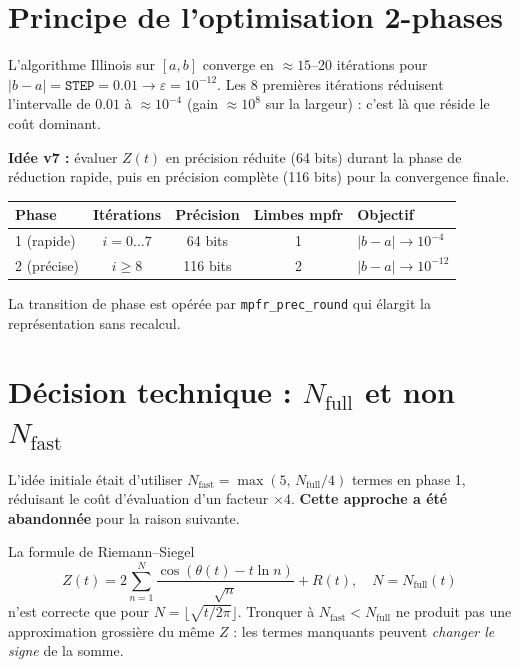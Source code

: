\documentclass[11pt,a4paper]{article}
\begin{document}
\section{Principe de l'optimisation 2-phases}

L'algorithme Illinois sur $[a, b]$ converge en $\approx 15$--20 itérations pour
$|b - a| = \texttt{STEP} = 0.01 \to \varepsilon = 10^{-12}$.
Les 8 premières itérations réduisent l'intervalle de $0.01$ à $\approx 10^{-4}$
(gain $\approx 10^{8}$ sur la largeur) : c'est là que réside le coût dominant.

\textbf{Idée v7 :} évaluer $Z(t)$ en précision réduite (64 bits) durant la phase de
réduction rapide, puis en précision complète (116 bits) pour la convergence finale.

\begin{center}
\renewcommand{\arraystretch}{1.3}
\begin{tabular}{lcccl}
\toprule
Phase & Itérations & Précision & Limbes mpfr & Objectif \\
\midrule
1 (rapide) & $i = 0 \dots 7$ & 64 bits & 1 & $|b-a| \to 10^{-4}$ \\
2 (précise) & $i \ge 8$ & 116 bits & 2 & $|b-a| \to 10^{-12}$ \\
\bottomrule
\end{tabular}
\end{center}

La transition de phase est opérée par \texttt{mpfr\_prec\_round} qui élargit la
représentation sans recalcul.

\section{Décision technique : $N_\text{full}$ et non $N_\text{fast}$}

L'idée initiale était d'utiliser $N_\text{fast} = \max(5,\, N_\text{full}/4)$ termes
en phase 1, réduisant le coût d'évaluation d'un facteur $\times 4$.
\textbf{Cette approche a été abandonnée} pour la raison suivante.

La formule de Riemann--Siegel
\begin{equation}
  Z(t) = 2\sum_{n=1}^{N} \frac{\cos\!\left(\theta(t) - t\ln n\right)}{\sqrt{n}}
         + R(t), \quad N = N_\text{full}(t)
\end{equation}
n'est correcte que pour $N = \lfloor\sqrt{t/2\pi}\rfloor$.
Tronquer à $N_\text{fast} < N_\text{full}$ ne produit pas une approximation
grossière du même $Z$ : les termes manquants peuvent \emph{changer le signe} de la somme.
\end{document}
